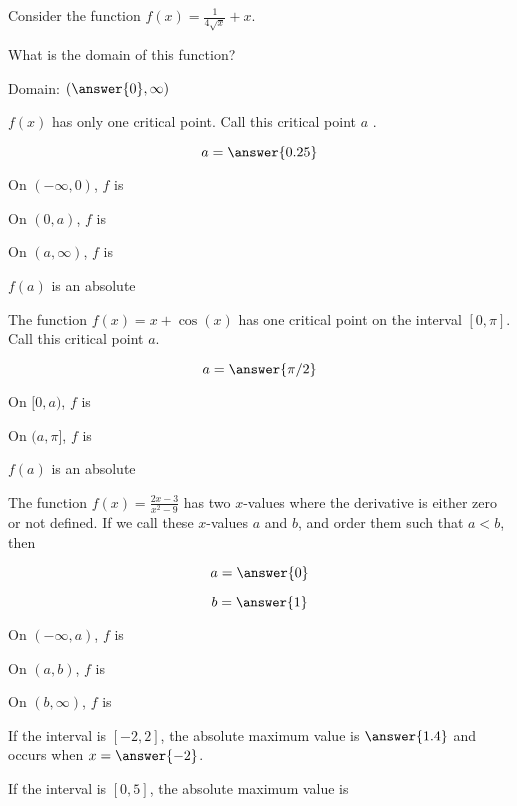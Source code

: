 \documentclass[handout]{ximera}
\begin{document}
\begin{exercise}
Consider the function $f(x) =\displaystyle\frac{1}{4\sqrt{x}}+x$.

What is the domain of this function? 

Domain: $ (\answer{0}, \infty)$

$f(x)$ has only one critical point.  Call this critical point $a$ .

$$
a = \answer{0.25}
$$

On $(-\infty,0)$, $f$ is 

On $(0,a)$, $f$ is 

On $(a,\infty)$, $f$ is 

$f(a)$ is an absolute 

\end{exercise}

\begin{exercise}
The function $f(x) =x+\cos(x)$ has one critical point on the interval $[0,\pi]$. Call this critical point $a$.

$$
a = \answer{\pi/2}
$$

On $[0,a)$, $f$ is 

On $(a,\pi]$, $f$ is 

$f(a)$ is an absolute 

\end{exercise}


\begin{exercise}
The function $f(x)=\displaystyle{\frac{2x-3}{x^2-9}}$ has two $x$-values where the derivative is either zero or not defined.  If we
call these $x$-values $a$ and $b$, and order them such that $a <
b $, then

$$
a = \answer{0}
$$

$$
b=\answer{1}
$$

On $(-\infty,a)$, $f$ is 

On $(a,b)$, $f$ is 

On $(b,\infty)$, $f$ is 

If the interval is $[-2,2]$, the absolute maximum value is $\answer{1.4}$ and occurs when $x = \answer{-2}$.

\vspace{.25in}

If the interval is $[0,5]$, the absolute maximum value is 


\end{exercise}
\end{document}
